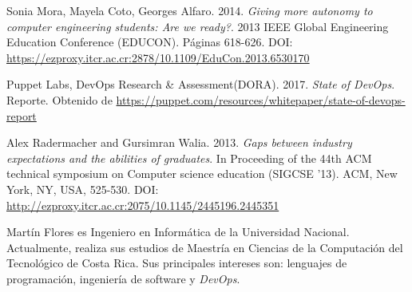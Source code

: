 \documentclass[journal]{IEEEtran}
\begin{document}
\begin{thebibliography}{1}
Sonia Mora, Mayela Coto, Georges Alfaro. 2014. \emph{Giving more autonomy to computer engineering students: Are we ready?}. 2013 IEEE Global Engineering Education Conference (EDUCON). Páginas 618-626. DOI: \url{https://ezproxy.itcr.ac.cr:2878/10.1109/EduCon.2013.6530170}

Puppet Labs, DevOps Research \& Assessment(DORA). 2017. \emph{State of DevOps}. Reporte. Obtenido de \url{https://puppet.com/resources/whitepaper/state-of-devops-report} 

Alex Radermacher and Gursimran Walia. 2013. \emph{Gaps between industry expectations and the abilities of graduates}. In Proceeding of the 44th ACM technical symposium on Computer science education (SIGCSE '13). ACM, New York, NY, USA, 525-530. DOI: \url{http://ezproxy.itcr.ac.cr:2075/10.1145/2445196.2445351}


\end{thebibliography}

% 

\begin{IEEEbiography}{Martín Flores}
es Ingeniero en Informática de la Universidad Nacional. Actualmente, realiza sus estudios de Maestría en Ciencias de la Computación del Tecnológico de Costa Rica. Sus principales intereses son: lenguajes de programación, ingeniería de software y \emph{DevOps}.
\end{IEEEbiography}







\end{document}
